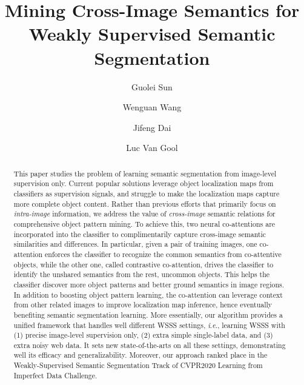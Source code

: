 \documentclass[runningheads]{llncs}
\newcommand{\ie}{\textit{i}.\textit{e}.}
\begin{document}
\pagestyle{headings}
\mainmatter
\def\ECCVSubNumber{3387}  \title{Mining Cross-Image Semantics for Weakly Supervised Semantic Segmentation}



\author{Guolei Sun\and
\Letter Wenguan Wang\and
Jifeng Dai\and
Luc Van Gool}

\maketitle
\begin{abstract}
This paper studies the problem of learning semantic segmentation from image-level supervision only. Current popular solutions leverage object localization maps from classifiers as supervision signals, and struggle to make the localization maps capture more complete object content. Rather than previous efforts that primarily focus on \textit{intra-image} information, we address the value of \textit{cross-image} semantic relations for comprehensive object pattern mining. To achieve this, two neural co-attentions are incorporated into the classifier to complimentarily capture cross-image semantic similarities and differences. In particular, given a pair of training images, one co-attention enforces the classifier to recognize the common semantics from co-attentive objects, while the other one, called contrastive co-attention, drives the classifier to identify the unshared semantics from the rest, uncommon objects. This helps the classifier discover more object patterns and better ground semantics in image regions. In addition to boosting object pattern learning, the co-attention can leverage context from other related images to improve localization map inference, hence eventually benefiting semantic segmentation learning. More essentially, our algorithm provides a unified framework that handles well different WSSS settings, \ie, learning WSSS with (1) precise image-level supervision only, (2) extra simple single-label data, and (3) extra noisy web data. It sets new state-of-the-arts on all these settings, demonstrating well its efficacy and generalizability. Moreover, our approach ranked  place in the Weakly-Supervised Semantic Segmentation Track of CVPR2020 Learning from Imperfect Data Challenge.

\end{abstract}
\end{document}
